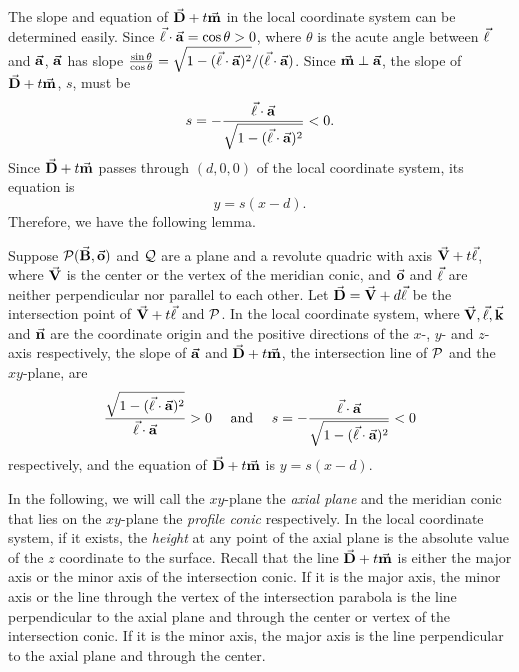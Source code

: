      The slope and  equation of $\vec{\bf D}+t\vec{\bf m}$ in the local 
coordinate system can be determined easily.
Since $\vec{\bf \ell}\cdot\vec{\bf a}=\cos\theta>0$, where $\theta$ is the acute
angle between $\vec{\bf \ell}$ and $\vec{\bf a}$, $\vec{\bf a}$ has slope
$\frac{\sin\theta}{\cos\theta}=
\sqrt{1-(\vec{\bf \ell}\cdot\vec{\bf a})^2}/(\vec{\bf \ell}\cdot\vec{\bf a})$.
Since $\vec{\bf m}\perp\vec{\bf a}$, the slope of $\vec{\bf D}+t\vec{\bf m}$, $s$, 
must be
\begin{equation}
\label{eqn:slope-s}
     s=-\frac{\vec{\bf \ell}\cdot\vec{\bf a}}
           {\sqrt{1-(\vec{\bf \ell}\cdot\vec{\bf a})^2}} < 0.
\end{equation}
Since $\vec{\bf D}+t\vec{\bf m}$ passes through $(d,0,0)$ of the local coordinate
system, its equation is
\begin{equation}
\label{eqn:d+tm}
     y = s(x-d).
\end{equation}
Therefore, we have the following lemma.

\begin{lemma}
\label{lemma:vectors}
     Suppose ${\cal P}(\vec{\bf B},\vec{\bf o})$ and ${\cal Q}$ are a plane and
a revolute quadric with axis $\vec{\bf V}+t\vec{\bf \ell}$, where $\vec{\bf V}$ is 
the center or the vertex of the meridian conic, and $\vec{\bf o}$ and 
$\vec{\bf \ell}$ are neither perpendicular nor parallel to each other.  
Let $\vec{\bf D}=\vec{\bf V}+d\vec{\bf \ell}$ be the intersection point
of $\vec{\bf V}+t\vec{\bf \ell}$ and ${\cal P}$.  In the local coordinate system, 
where $\vec{\bf V},\vec{\bf \ell},\vec{\bf k}$ and $\vec{\bf n}$ are the coordinate 
origin and the positive directions of the $x$-, $y$- and $z$-axis respectively,
the slope of $\vec{\bf a}$ and $\vec{\bf D}+t\vec{\bf m}$, the intersection line of 
${\cal P}$ and the $xy$-plane, are
\[
\frac{\sqrt{1-(\arrow{\ell}\cdot\arrow{a})^2}}{\arrow{\ell}\cdot\arrow{a}}>0
\ \ \ \ \mbox{and}\ \ \ \ 
s=-\frac{\arrow{\ell}\cdot\arrow{a}}{\sqrt{1-(\arrow{\ell}\cdot\arrow{a})^2}}<0
\]
respectively, and the equation of $\vec{\bf D}+t\vec{\bf m}$ is $y=s(x-d)$.
\end{lemma}

     In the following, we will call the $xy$-plane the {\em axial plane} and 
the meridian conic that lies on the $xy$-plane the {\em profile conic} 
respectively.   In the local coordinate system, if it exists, the {\em height}
at any point of the axial plane is the absolute value of the $z$ coordinate to
the surface.  Recall that the line $\vec{\bf D}+t\vec{\bf m}$ is either the major 
axis or the minor axis of the intersection conic.  If it is the major axis, 
the minor axis or the line through the vertex of the intersection parabola is 
the line perpendicular to the axial plane and through the center or vertex of 
the intersection conic.  If it is the minor axis, the major axis is the line
perpendicular to the axial plane and through the center.

